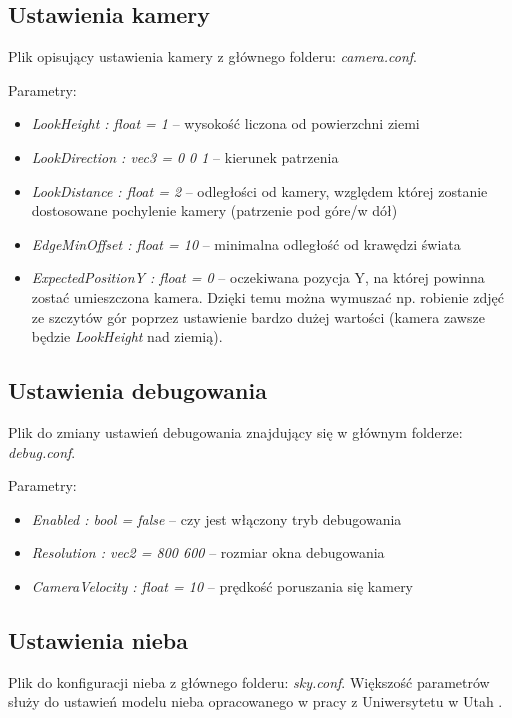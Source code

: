 \documentclass[inz,shortabstract]{iithesis}
\begin{document}
        \subsection{Ustawienia kamery} \label{cameraConfig}
        Plik opisujący ustawienia kamery z głównego folderu: \textit{camera.conf}.
        
        Parametry:
        \begin{itemize}
            \item \textit{LookHeight : float = 1} -- wysokość liczona od  powierzchni ziemi 
            \item \textit{LookDirection : vec3 = 0 0 1} -- kierunek patrzenia 
            \item \textit{LookDistance : float = 2} -- odległości od kamery, względem której zostanie dostosowane pochylenie kamery (patrzenie pod góre/w dół)
            \item \textit{EdgeMinOffset : float = 10} -- minimalna odległość od krawędzi świata  
            \item \textit{ExpectedPositionY : float = 0} -- oczekiwana pozycja Y, na której powinna zostać umieszczona kamera. Dzięki temu można wymuszać np. robienie zdjęć ze szczytów gór poprzez ustawienie bardzo dużej wartości (kamera zawsze będzie \textit{LookHeight} nad ziemią). 
        \end{itemize}
        
        \subsection{Ustawienia debugowania} \label{debugConfig}
        Plik do zmiany ustawień debugowania znajdujący się w głównym folderze: \textit{debug.conf}.
        
        Parametry:
        \begin{itemize}
            \item \textit{Enabled : bool = false} -- czy jest włączony tryb debugowania
            \item \textit{Resolution : vec2 = 800 600} -- rozmiar okna debugowania
            \item \textit{CameraVelocity : float = 10} -- prędkość poruszania się kamery 
        \end{itemize}
        
        \subsection{Ustawienia nieba}
        Plik do konfiguracji nieba z głównego folderu: \textit{sky.conf}. Większość parametrów służy do ustawień modelu nieba opracowanego w pracy z Uniwersytetu w Utah \cite{sky}.
        
\end{document}
